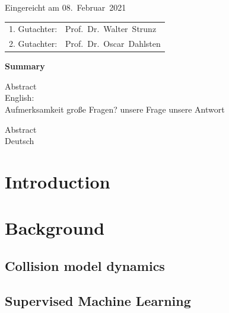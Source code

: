 \thispagestyle{empty}\vspace*{48em}

Eingereicht am 08.~Februar~2021\vspace{1.5em}
\par{\large\begin{tabular}{ll}
 1. Gutachter: & Prof.~Dr.~Walter~Strunz \\
 2. Gutachter: & Prof.~Dr.~Oscar~Dahlsten \\
\end{tabular}}


\newpage
\begin{center}\large\bfseries Summary\end{center}


Abstract \\ 
English: \\
Aufmerksamkeit
große Fragen?
unsere Frage
unsere Antwort

\vspace{20em}
Abstract \\ 
Deutsch \\
 
 
\tableofcontents



\mainmatter

\chapter{Introduction}


\chapter{Background} \label{background}
\section{Collision model dynamics} \label{col_model}


%
\section{Supervised Machine Learning} \label{sml}



